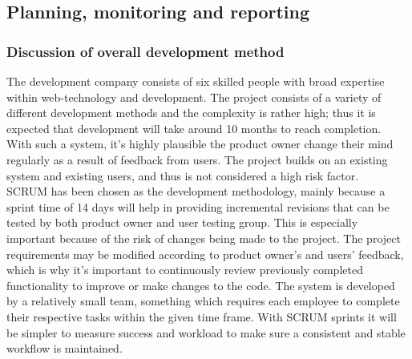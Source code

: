 \subsection{Planning, monitoring and reporting}
\subsubsection{Discussion of overall development method}
The development company consists of six skilled people with broad expertise within web-technology and development. The project consists of a variety of different development methods and the complexity is rather high; thus it is expected that development will take around 10 months to reach completion.\\
With such a system, it’s highly plausible the product owner change their mind regularly as a result of feedback from users. The project builds on an existing system and existing users, and thus is not considered a high risk factor.\\

SCRUM has been chosen as the development methodology, mainly because a sprint time of 14 days will help in providing incremental revisions that can be tested by both product owner and user testing group. This is especially important because of the risk of changes being made to the project. The project requirements may be modified according to product owner’s and users’ feedback, which is why it’s important to continuously review previously completed functionality to improve or make changes to the code.
The system is developed by a relatively small team, something which requires each employee to complete their respective tasks within the given time frame. With SCRUM sprints it will be simpler to measure success and workload to make sure a consistent and stable workflow is maintained.
